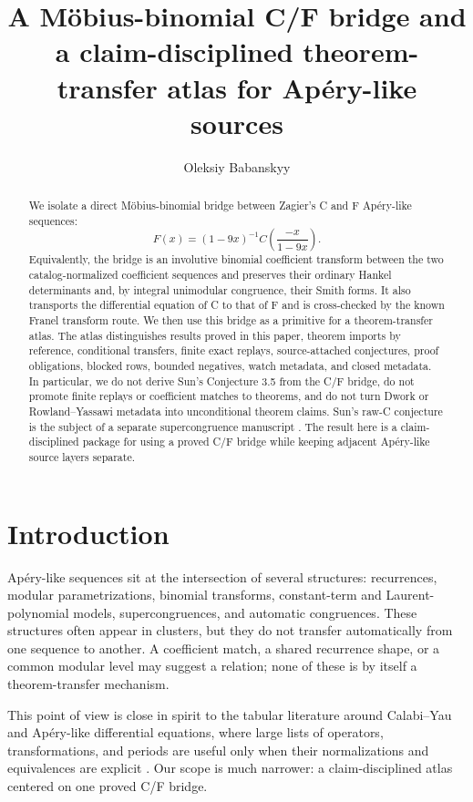 \documentclass[11pt,a4paper]{article}
\title{A M\"obius-binomial C/F bridge and a claim-disciplined theorem-transfer atlas for Ap{\'e}ry-like sources}
\author{Oleksiy Babanskyy}
\date{}
\begin{document}
\maketitle

\begin{abstract}
We isolate a direct M\"obius-binomial bridge between Zagier's C and F
Ap{\'e}ry-like sequences:
\[
  F(x)=(1-9x)^{-1} C\!\left(\frac{-x}{1-9x}\right).
\]
Equivalently, the bridge is an involutive binomial coefficient transform
between the two catalog-normalized coefficient sequences and preserves their
ordinary Hankel determinants and, by integral unimodular congruence, their
Smith forms. It also transports the differential equation of C to that of F
and is cross-checked by the known Franel transform route.  We
then use this bridge as a primitive for a theorem-transfer atlas.  The atlas
distinguishes results proved in this paper,
theorem imports by reference, conditional transfers, finite exact replays,
source-attached conjectures, proof obligations, blocked rows, bounded
negatives, watch metadata, and closed metadata.  In particular, we do not
derive Sun's Conjecture 3.5 from the C/F bridge, do not promote finite
replays or coefficient matches to theorems, and do not turn Dwork or
Rowland--Yassawi metadata into unconditional theorem claims.  Sun's raw-C
conjecture is the subject of a separate supercongruence manuscript
\cite{babanskyy_2026_sun35_bridge}.  The result here is a claim-disciplined
package for using a proved C/F bridge while keeping adjacent Ap{\'e}ry-like
source layers separate.
\end{abstract}

\section{Introduction}
\label{sec:introduction}

Ap{\'e}ry-like sequences sit at the intersection of several structures:
recurrences, modular parametrizations, binomial transforms, constant-term and
Laurent-polynomial models, supercongruences, and automatic congruences.  These
structures often appear in clusters, but they do not transfer automatically
from one sequence to another.  A coefficient match, a shared recurrence shape,
or a common modular level may suggest a relation; none of these is by itself a
theorem-transfer mechanism.

This point of view is close in spirit to the tabular literature around
Calabi--Yau and Ap{\'e}ry-like differential equations, where large lists of
operators, transformations, and periods are useful only when their
normalizations and equivalences are explicit
\cite{almkvist_van_enckevort_van_straten_zudilin_2005_tables,
almkvist_van_straten_zudilin_2011_clausen}.  Our scope is much narrower: a
claim-disciplined atlas centered on one proved C/F bridge.
\end{document}
